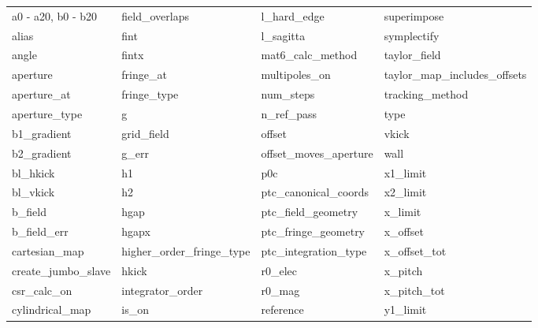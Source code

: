  \begin{tabular}{llll} \toprule
a0 - a20, b0 - b20          & field_overlaps              & l_hard_edge                 & superimpose                 \\
alias                       & fint                        & l_sagitta                   & symplectify                 \\
angle                       & fintx                       & mat6_calc_method            & taylor_field                \\
aperture                    & fringe_at                   & multipoles_on               & taylor_map_includes_offsets \\
aperture_at                 & fringe_type                 & num_steps                   & tracking_method             \\
aperture_type               & g                           & n_ref_pass                  & type                        \\
b1_gradient                 & grid_field                  & offset                      & vkick                       \\
b2_gradient                 & g_err                       & offset_moves_aperture       & wall                        \\
bl_hkick                    & h1                          & p0c                         & x1_limit                    \\
bl_vkick                    & h2                          & ptc_canonical_coords        & x2_limit                    \\
b_field                     & hgap                        & ptc_field_geometry          & x_limit                     \\
b_field_err                 & hgapx                       & ptc_fringe_geometry         & x_offset                    \\
cartesian_map               & higher_order_fringe_type    & ptc_integration_type        & x_offset_tot                \\
create_jumbo_slave          & hkick                       & r0_elec                     & x_pitch                     \\
csr_calc_on                 & integrator_order            & r0_mag                      & x_pitch_tot                 \\
cylindrical_map             & is_on                       & reference                   & y1_limit                    \\

\end{tabular}
